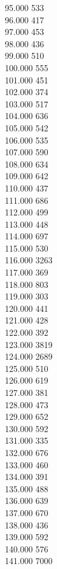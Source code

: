 { 95.000	533 \\
 96.000	417 \\
 97.000	453 \\
 98.000	436 \\
 99.000	510 \\
 100.000	555 \\
 101.000	451 \\
 102.000	374 \\
 103.000	517 \\
 104.000	636 \\
 105.000	542 \\
 106.000	535 \\
 107.000	590 \\
 108.000	634 \\
 109.000	642 \\
 110.000	437 \\
 111.000	686 \\
 112.000	499 \\
 113.000	448 \\
 114.000	697 \\
 115.000	530 \\
 116.000	3263 \\
 117.000	369 \\
 118.000	803 \\
 119.000	303 \\
 120.000	441 \\
 121.000	428 \\
 122.000	392 \\
 123.000	3819 \\
 124.000	2689 \\
 125.000	510 \\
 126.000	619 \\
 127.000	381 \\
 128.000	473 \\
 129.000	652 \\
 130.000	592 \\
 131.000	335 \\
 132.000	676 \\
 133.000	460 \\
 134.000	391 \\
 135.000	488 \\
 136.000	639 \\
 137.000	670 \\
 138.000	436 \\
 139.000	592 \\
 140.000	576 \\
 141.000	7000 \\
}
